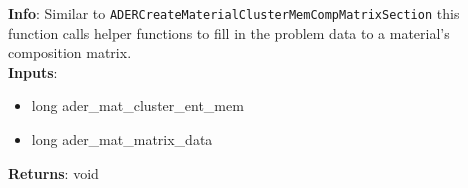 \textbf{Info}: Similar to \texttt{ADERCreateMaterialClusterMemCompMatrixSection}
this function calls helper functions to fill in the problem data to a material's
composition matrix. \\

\noindent \textbf{Inputs}:
\begin{itemize}
\item{long ader\_mat\_cluster\_ent\_mem}
\item{long ader\_mat\_matrix\_data}
\end{itemize}

\noindent \textbf{Returns}: void
